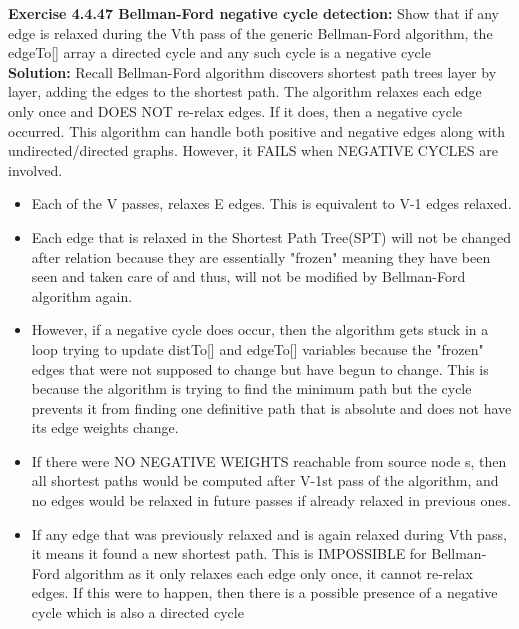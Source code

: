 \documentclass[11pt,fleqn]{article}
\begin{document}
\textbf{Exercise 4.4.47 Bellman-Ford negative cycle detection:} Show that if any edge is relaxed during the Vth pass of the generic Bellman-Ford algorithm, the edgeTo[] array a directed cycle and any such cycle is a negative cycle\\

\textbf{Solution:} Recall Bellman-Ford algorithm discovers shortest path trees layer by layer, adding the edges to the shortest path. The algorithm relaxes each edge only once and DOES NOT re-relax edges. If it does, then a negative cycle occurred. This algorithm can handle both positive and negative edges along with undirected/directed graphs. However, it FAILS when NEGATIVE CYCLES are involved.

\begin{itemize}
	\item Each of the V passes, relaxes E edges. This is equivalent to V-1 edges relaxed.
	
	\item Each edge that is relaxed in the Shortest Path Tree(SPT) will not be changed after relation because they are essentially "frozen" meaning they have been seen and taken care of and thus, will not be modified by Bellman-Ford algorithm again.
	
	\item However, if a negative cycle does occur, then the algorithm gets stuck in a loop trying to update distTo[] and edgeTo[] variables because the "frozen" edges that were not supposed to change but have begun to change. This is because the algorithm is trying to find the minimum path but the cycle prevents it from finding one definitive path that is absolute and does not have its edge weights change.
	
	\item If there were NO NEGATIVE WEIGHTS reachable from source node s, then all shortest paths would be computed after V-1st pass of the algorithm, and no edges would be relaxed in future passes if already relaxed in previous ones.
	
	\item If any edge that was previously relaxed and is again relaxed during Vth pass, it means it found a new shortest path. This is IMPOSSIBLE for Bellman-Ford algorithm as it only relaxes each edge only once, it cannot re-relax edges. If this were to happen, then there is a possible presence of a negative cycle which is also a directed cycle
\end{itemize}
\end{document}
